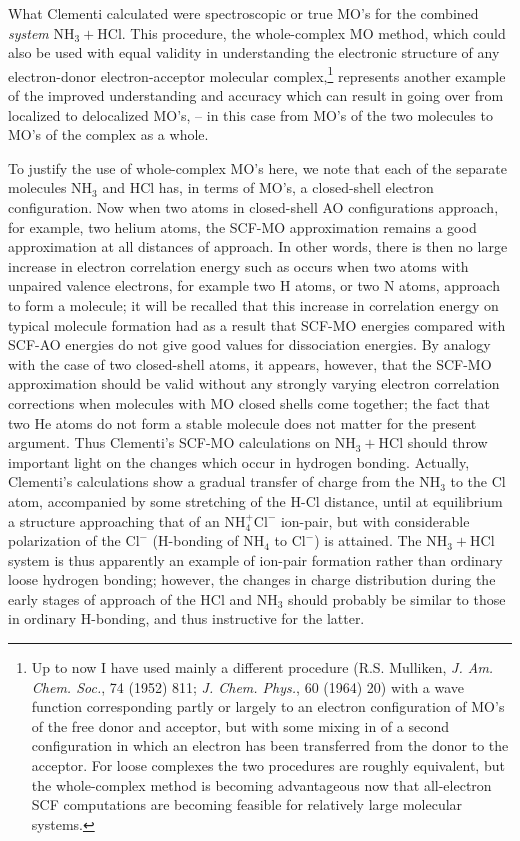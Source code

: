 \documentclass[11pt]{memoir}
\begin{document}
What Clementi calculated were spectroscopic or true MO's for the combined \emph{system} $\mathrm{NH_3 + HCl}$.  This procedure, the whole-complex MO method, which could also be used with equal validity in understanding the electronic structure of any electron-donor electron-acceptor molecular complex,\footnote{Up to now I have used mainly a different procedure (R.S. Mulliken, \emph{J. Am. Chem. Soc.}, 74 (1952) 811; \emph{J. Chem. Phys.}, 60 (1964) 20) with a wave function corresponding partly or largely to an electron configuration of MO's of the free donor and acceptor, but with some mixing in of a second configuration in which an electron has been transferred from the donor to the acceptor.  For loose complexes the two procedures are roughly equivalent, but the whole-complex method is becoming advantageous now that all-electron SCF computations are becoming feasible for relatively large molecular systems.} represents another example of the improved understanding and accuracy which can result in going over from localized to delocalized MO's, -- in this case from MO's of the two molecules to MO's of the complex as a whole.

To justify the use of whole-complex MO's here, we note that each of the separate molecules $\mathrm{NH_3}$ and HCl has, in terms of MO's, a closed-shell electron configuration.  Now when two atoms in closed-shell AO configurations approach, for example, two helium atoms, the SCF-MO approximation remains a good approximation at all distances of approach.  In other words, there is then no large increase in electron correlation energy such as occurs when two atoms with unpaired valence electrons, for example two H atoms, or two N atoms, approach to form a molecule; it will be recalled that this increase in correlation energy on typical molecule formation had as a result that SCF-MO energies compared with SCF-AO energies do not give good values for dissociation energies.  By analogy with the case of two closed-shell atoms, it appears, however, that the SCF-MO approximation should be valid without any strongly varying electron correlation corrections when molecules with MO closed shells come together; the fact that two He atoms do not form a stable molecule does not matter for the present argument.  Thus Clementi's SCF-MO calculations on $\mathrm{NH_3 + HCl}$ should throw important light on the changes which occur in hydrogen bonding.  Actually, Clementi's calculations show a gradual transfer of charge from the $\mathrm{NH_3}$ to the Cl atom, accompanied by some stretching of the H-Cl distance, until at equilibrium a structure approaching that of an $\mathrm{NH_4^+ Cl^-}$ ion-pair, but with considerable polarization of the $\mathrm{Cl^-}$ (H-bonding of $\mathrm{NH_4}$ to $\mathrm{Cl^-}$) is attained.  The $\mathrm{NH_3 + HCl}$ system is thus apparently an example of ion-pair formation rather than ordinary loose hydrogen bonding; however, the changes in charge distribution during the early stages of approach of the HCl and $\mathrm{NH_3}$ should probably be similar to those in ordinary H-bonding, and thus instructive for the latter.
\end{document}
